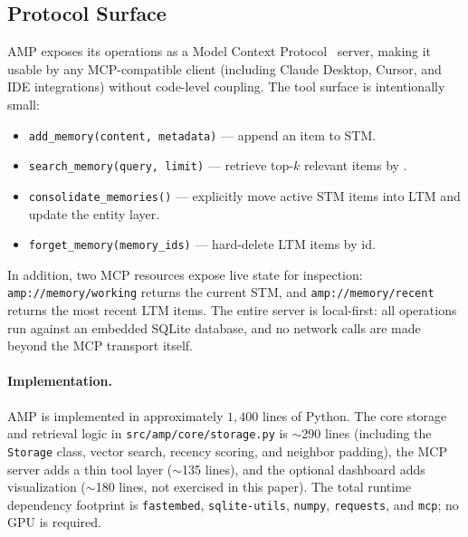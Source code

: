 \subsection{Protocol Surface}
\label{sec:method-protocol}

AMP exposes its operations as a Model Context Protocol~\citep{anthropic2024mcp} server, making it usable by any MCP-compatible client (including Claude Desktop, Cursor, and IDE integrations) without code-level coupling. The tool surface is intentionally small:

\begin{itemize}
    \item \texttt{add\_memory(content, metadata)} --- append an item to STM.
    \item \texttt{search\_memory(query, limit)} --- retrieve top-$k$ relevant items by .
    \item \texttt{consolidate\_memories()} --- explicitly move active STM items into LTM and update the entity layer.
    \item \texttt{forget\_memory(memory\_ids)} --- hard-delete LTM items by id.
\end{itemize}

In addition, two MCP resources expose live state for inspection: \texttt{amp://memory/working} returns the current STM, and \texttt{amp://memory/recent} returns the most recent LTM items. The entire server is local-first: all operations run against an embedded SQLite database, and no network calls are made beyond the MCP transport itself.

\paragraph{Implementation.} AMP is implemented in approximately $1{,}400$ lines of Python. The core storage and retrieval logic in \texttt{src/amp/core/storage.py} is $\sim$290 lines (including the \texttt{Storage} class, vector search, recency scoring, and neighbor padding), the MCP server adds a thin tool layer ($\sim$135 lines), and the optional dashboard adds visualization ($\sim$180 lines, not exercised in this paper). The total runtime dependency footprint is \texttt{fastembed}, \texttt{sqlite-utils}, \texttt{numpy}, \texttt{requests}, and \texttt{mcp}; no GPU is required.
